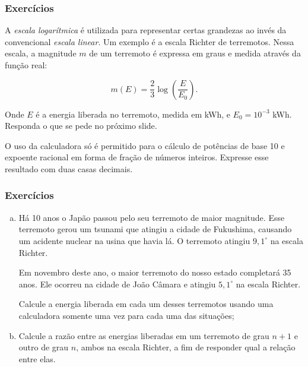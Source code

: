 
\begin{frame}
\frametitle{Exercícios}

\begin{exercise}
    A \emph{escala logarítmica} é utilizada para representar certas grandezas ao invés da convencional \emph{escala linear}. Um exemplo é a escala Richter de terremotos. Nessa escala, a magnitude $m$ de um terremoto é expressa em graus e medida através da função real:

    $$m (E) = \dfrac{2}{3} \log \left( \dfrac E {E_0} \right).$$

    Onde $E$ é a energia liberada no terremoto, medida em kWh, e $E_0 = 10^{-3}$ kWh. Responda o que se pede no próximo slide.
	\begin{remark}
		O uso da calculadora só é permitido para o cálculo de potências de base 10 e expoente racional em forma de fração de números inteiros. Expresse esse resultado com duas casas decimais.
   \end{remark}
\end{exercise}

\end{frame}



\begin{frame}
\frametitle{Exercícios}

    \begin{enumerate}[(a)]
        \item Há 10 anos o Japão passou pelo seu terremoto de maior magnitude. Esse terremoto  gerou um tsunami que atingiu a cidade de Fukushima, causando um acidente nuclear na usina que havia lá. O terremoto atingiu $9{,}1^\circ $ na escala Richter.

        Em novembro deste ano, o maior terremoto do nosso estado completará 35 anos. Ele ocorreu na cidade de João Câmara e atingiu $5{,}1^\circ$ na escala Richter.

        Calcule a energia liberada em cada um desses terremotos usando uma calculadora somente uma vez para cada uma das situações;
        \item Calcule a razão entre as energias liberadas em um terremoto de grau $n+1$ e outro de grau $n$, ambos na escala Richter, a fim de responder qual a relação entre elas.
    \end{enumerate}


\end{frame}



